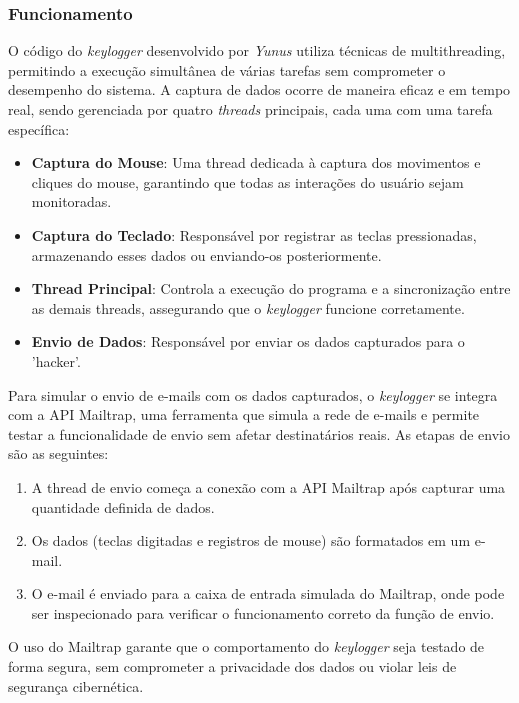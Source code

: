 \documentclass[12pt]{article}
\begin{document}
\subsubsection{Funcionamento}

O código do \textit{keylogger} desenvolvido por \textit{Yunus} utiliza técnicas de multithreading, permitindo a execução simultânea de várias tarefas sem comprometer o desempenho do sistema. A captura de dados ocorre de maneira eficaz e em tempo real, sendo gerenciada por quatro \textit{threads} principais, cada uma com uma tarefa específica:

\begin{itemize}
    \item \textbf{Captura do Mouse}: Uma thread dedicada à captura dos movimentos e cliques do mouse, garantindo que todas as interações do usuário sejam monitoradas.
    \item \textbf{Captura do Teclado}: Responsável por registrar as teclas pressionadas, armazenando esses dados ou enviando-os posteriormente.
    \item \textbf{Thread Principal}: Controla a execução do programa e a sincronização entre as demais threads, assegurando que o \textit{keylogger} funcione corretamente.
    \item \textbf{Envio de Dados}: Responsável por enviar os dados capturados para o 'hacker'.
\end{itemize}

Para simular o envio de e-mails com os dados capturados, o \textit{keylogger} se integra com a API Mailtrap, uma ferramenta que simula a rede de e-mails e permite testar a funcionalidade de envio sem afetar destinatários reais. As etapas de envio são as seguintes:

\begin{enumerate}
    \item A thread de envio começa a conexão com a API Mailtrap após capturar uma quantidade definida de dados.
    \item Os dados (teclas digitadas e registros de mouse) são formatados em um e-mail.
    \item O e-mail é enviado para a caixa de entrada simulada do Mailtrap, onde pode ser inspecionado para verificar o funcionamento correto da função de envio.
\end{enumerate}

O uso do Mailtrap garante que o comportamento do \textit{keylogger} seja testado de forma segura, sem comprometer a privacidade dos dados ou violar leis de segurança cibernética.
\end{document}
